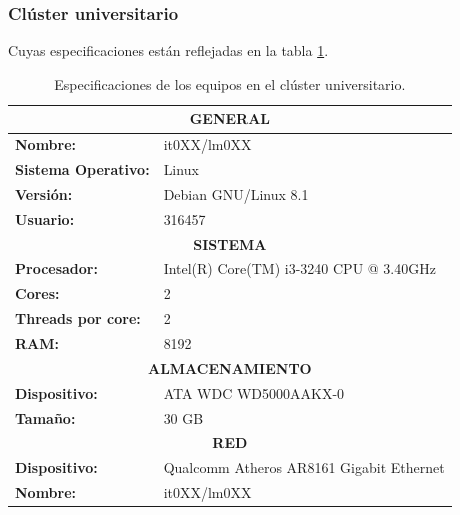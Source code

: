 \subsubsection{Clúster universitario}
Cuyas especificaciones están reflejadas en la tabla \ref{equipoUniversitario}.
\begin{table}[htp!]
	\centering
	\caption{Especificaciones de los equipos en el clúster universitario.}
	\label{equipoUniversitario}
	\begin{tabular}{|l|l|}
		\hline
		\multicolumn{2}{|c|}{\textbf{GENERAL}}                                      \\ \hline
		\textbf{Nombre:}            & it0XX/lm0XX                                   \\ \hline
		\textbf{Sistema Operativo:} & Linux                                         \\ \hline
		\textbf{Versión:}           & Debian GNU/Linux 8.1                          \\ \hline
		\textbf{Usuario:}           & 316457                                        \\ \hline
		\multicolumn{2}{|c|}{\textbf{SISTEMA}}                                      \\ \hline
		\textbf{Procesador:}        & Intel(R) Core(TM) i3-3240 CPU @ 3.40GHz       \\ \hline
		\textbf{Cores:}             & 2                                             \\ \hline
		\textbf{Threads por core:}  & 2                                             \\ \hline
		\textbf{RAM:}               & 8192                                          \\ \hline
		\multicolumn{2}{|c|}{\textbf{ALMACENAMIENTO}}                               \\ \hline
		\textbf{Dispositivo:}       & ATA WDC WD5000AAKX-0 \\ \hline
		\textbf{Tamaño:}            & 30 GB                                         \\ \hline
		\multicolumn{2}{|c|}{\textbf{RED}}                                          \\ \hline
		\textbf{Dispositivo:}       & Qualcomm Atheros AR8161 Gigabit Ethernet      \\ \hline
		\textbf{Nombre:}            & it0XX/lm0XX                                   \\ \hline
	\end{tabular}
\end{table}

